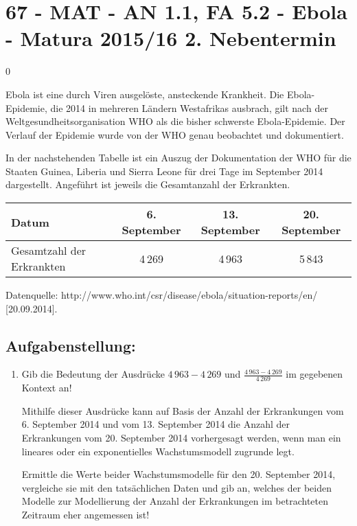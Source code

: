 \section{67 - MAT - AN 1.1, FA 5.2 - Ebola - Matura 2015/16 2. Nebentermin}

\begin{langesbeispiel} \item[0] %
	
 Ebola ist eine durch Viren ausgelöste, ansteckende Krankheit. Die Ebola-Epidemie, die 2014 in mehreren Ländern Westafrikas ausbrach, gilt nach der Weltgesundheitsorganisation WHO als die bisher schwerste Ebola-Epidemie. Der Verlauf der Epidemie wurde von der WHO genau beobachtet und dokumentiert.

In der nachstehenden Tabelle ist ein Auszug der Dokumentation der WHO für die Staaten Guinea, Liberia und Sierra Leone für drei Tage im September 2014 dargestellt. Angeführt ist jeweils die Gesamtanzahl der Erkrankten.

\begin{center}
	\begin{tabular}{|l|c|c|c|}\hline
	\cellcolor[gray]{0.9}Datum&6. September&13. September&20. September\\ \hline
	\cellcolor[gray]{0.9}Gesamtzahl der Erkrankten&4\,269&4\,963&5\,843\\ \hline	
	\end{tabular}
\end{center}
\begin{scriptsize}Datenquelle: http://www.who.int/csr/disease/ebola/situation-reports/en/ [20.09.2014].\end{scriptsize}

\subsection{Aufgabenstellung:}
\begin{enumerate}
	\item Gib die Bedeutung der Ausdrücke $4\,963-4\,269$ und $\frac{4\,963-4\,269}{4\,269}$ im gegebenen Kontext an!
	
Mithilfe dieser Ausdrücke kann auf Basis der Anzahl der Erkrankungen vom 6. September 2014 und vom 13. September 2014 die Anzahl der Erkrankungen vom 20. September 2014 vorhergesagt werden, wenn man ein lineares oder ein exponentielles Wachstumsmodell zugrunde legt. 

 Ermittle die Werte beider Wachstumsmodelle für den 20. September 2014, vergleiche sie mit den tatsächlichen Daten und gib an, welches der beiden Modelle zur Modellierung der Anzahl der Erkrankungen im betrachteten Zeitraum eher angemessen ist!
	

\end{enumerate}
\end{langesbeispiel}
